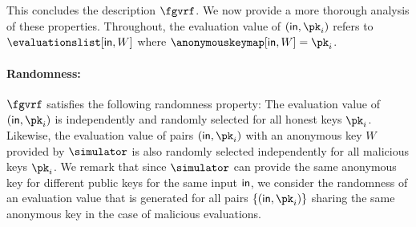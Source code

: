 	\\\\
	This concludes the description $ \fgvrf $.  
	We  now provide a more thorough analysis of these properties. Throughout, the evaluation value of $ (\msg, \pk_i) $ refers to $ \evaluationslist[\msg,W] $ where $ \anonymouskeymap[\msg,W] = \pk_i $.
	
	
	

	\paragraph{Randomness:} $ \fgvrf $  satisfies the following randomness property:  The evaluation value of $ (\msg, \pk_i) $ is independently and randomly selected for all honest keys $\pk_i$.
	Likewise, the evaluation value of pairs ${(\msg, \pk_i)}$ with an anonymous key $W$ provided by $\simulator$ is also randomly selected independently for all malicious keys $\pk_i$.  We remark that since $ \simulator $ can provide the same anonymous key for different public keys for the same input $ \mathsf{in} $, we consider the randomness of an evaluation value that is generated for all pairs $ \{(\msg, \pk_i)\} $ sharing the same anonymous key in the case of malicious evaluations.
	
	
	
